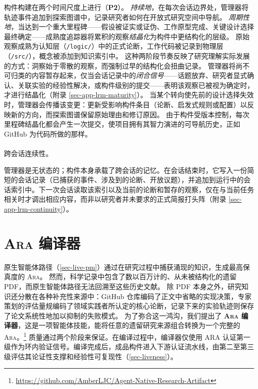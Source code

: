 \documentclass[
]{article}
\makeatletter
\let\oldparagraph\paragraph
\renewcommand{\paragraph}{
    \@ifstar
      \xxxParagraphStar
      \xxxParagraphNoStar
  }
\newcommand{\xxxParagraphStar}[1]{\oldparagraph*{#1}\mbox{}}
\newcommand{\xxxParagraphNoStar}[1]{\oldparagraph{#1}\mbox{}}
\newcommand{\passthrough}[1]{#1}
\theoremstyle{definition}
\newcommand{\ara}{\textsc{Ara}}
\makeatother
\begin{document}
构件构建在两个时间尺度上进行（\textbf{P2}）。
\emph{持续地}，在每次会话边界处，管理器将轨迹事件追加到探索图谱中，记录研究者如何在开放式研究空间中导航。
\emph{周期性地}，当达到一个重大里程碑------假设被证实或证伪、工作原型完成、关键设计选择最终确定------成熟度追踪器将累积的观察\emph{结晶化}为构件中更结构化的层级。
原始观察成熟为认知层（\passthrough{\lstinline!/logic/!}）中的正式论断，工作代码被记录到物理层（\passthrough{\lstinline!/src/!}），概念被添加到知识索引中。
这种两阶段节奏反映了研究理解实际发展的方式：洞察始于零散的观察，而强制过早的结构化会扭曲记录。
管理器将尚不可归类的内容暂存起来，仅当会话记录中的\emph{闭合信号}------话题放弃、研究者显式确认、关联实验的经验性解决，或构件级别的提交------表明该观察已被视为确定时，才进行结晶化（附录
\ref{sec-app-lrm-maturity}）。
当某个转向使先前的设计选择失效时，管理器会传播该变更：更新受影响构件条目（论断、启发式规则或配置）以反映新的方向，而探索图谱保留原始理由和修订原因。
由于构件受版本控制，每次里程碑结晶化都会产生一次提交，使项目拥有其智力演进的可导航历史，正如
GitHub 为代码所做的那样。

\paragraph{跨会话连续性。}\label{ux8de8ux4f1aux8bddux8fdeux7eedux6027}

管理器是无状态的；构件本身承载了跨会话的记忆。在会话结束时，它写入一份简短的会话记录（已捕获的事件、涉及到的论断、开放议题），并追加到运行中的会话索引中。下一次会话读取该索引以及当前的论断和暂存的观察，仅在与当前任务相关时才调出相应内容，而非以研究者并未要求的正式简报打头阵（附录
\ref{sec-app-lrm-continuity}）。

\section{\texorpdfstring{\ara{} 编译器}{ 编译器}}\label{sec-ingestor}

原生智能体路径（\ref{sec-live-pm}）通过在研究过程中捕获涌现的知识，生成最高保真度的
\ara{}。 然而，科学记录中包含了数以百万计的、从未被结构化的遗留
PDF，而原生智能体路径无法回溯至这些历史文献。 除 PDF
本身之外，研究知识还分散在各种补充性来源中：GitHub
仓库编码了正文中省略的实现决策，专家策划的评估量规编码了领域实践者所认定的核心论断，记录下来的实验轨迹则保存了论文系统性地加以抑制的失败模式。
为了弥合这一鸿沟，我们提出了 \textbf{\ara{}
编译器}，这是一项智能体技能，能将任意的遗留研究来源组合转换为一个完整的
\ara{}。\footnote{\url{https://github.com/AmberLJC/Agent-Native-Research-Artifact}}
质量通过两个阶段来保证。在编译过程中，编译器仅使用 ARA
认证第一级作为环内验证信号。编译完成后，成品构件进入下游认证流水线，由第二至第三级评估其论证性支撑和经验性可复现性（\ref{sec-liveness}）。
\end{document}
